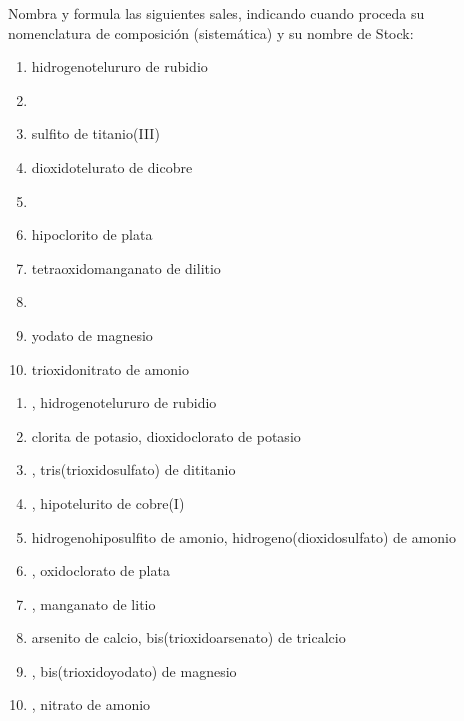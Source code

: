 \documentclass[10pt,a5paper,twoside]{article}
\begin{document}
\begin{exercise}[
    tags    = {inorgánica,sales,sales binarias,sales ternarias},
    topics  = {química inorgánica,formulación,nomenclatura},
    source  = {SAN Formulación, p29, e39},
  ]
  Nombra y formula las siguientes sales, indicando cuando proceda su nomenclatura de composición (sistemática) y su nombre de Stock:

  \begin{enumerate}
    \item hidrogenotelururo de rubidio
    \item {}
    \item sulfito de titanio(III)
    \item dioxidotelurato de dicobre
    \item {}
    \item hipoclorito de plata
    \item tetraoxidomanganato de dilitio
    \item {}
    \item yodato de magnesio
    \item trioxidonitrato de amonio
  \end{enumerate}
\end{exercise}

\begin{solution}
  \begin{enumerate}
    \item {}, hidrogenotelururo de rubidio
    \item clorita de potasio, dioxidoclorato de potasio
    \item {}, tris(trioxidosulfato) de dititanio
    \item {}, hipotelurito de cobre(I)
    \item hidrogenohiposulfito de amonio, hidrogeno(dioxidosulfato) de amonio
    \item {}, oxidoclorato de plata
    \item {}, manganato de litio
    \item arsenito de calcio, bis(trioxidoarsenato) de tricalcio
    \item {}, bis(trioxidoyodato) de magnesio
    \item {}, nitrato de amonio
  \end{enumerate}
\end{solution}
\end{document}
